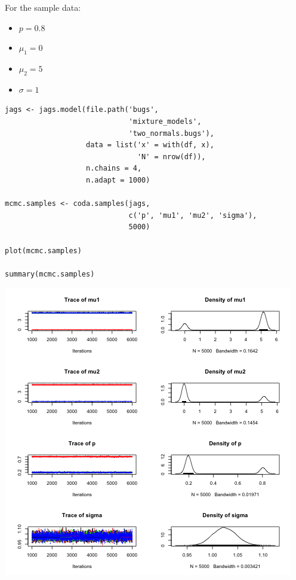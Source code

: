 \documentclass{beamer}
\begin{document}
\begin{frame}[fragile]
For the sample data:
  \begin{itemize}
    \item{$p = 0.8$}
    \item{$\mu_1 = 0$}
    \item{$\mu_2 = 5$}
    \item{$\sigma = 1$}
  \end{itemize}
\end{frame}

\begin{frame}[fragile]
  \begin{verbatim}
jags <- jags.model(file.path('bugs',
                             'mixture_models',
                             'two_normals.bugs'),
                   data = list('x' = with(df, x),
                               'N' = nrow(df)),
                   n.chains = 4,
                   n.adapt = 1000)
 
mcmc.samples <- coda.samples(jags,
                             c('p', 'mu1', 'mu2', 'sigma'),
                             5000)

plot(mcmc.samples)

summary(mcmc.samples)
  \end{verbatim}
\end{frame}

\begin{frame}[fragile]
  \begin{center}
    \includegraphics[scale = 0.4]{../graphs/mixture_models/two_normals_plot1.png}
  \end{center}
\end{frame}
\end{document}
